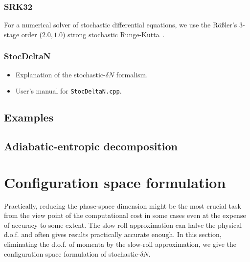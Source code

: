 \documentclass[aps, prd
, preprint
, nofootinbib 
, longbibliography
]{revtex4-1}
\begin{document}
\subsubsection{SRK32}

For a numerical solver of stochastic differential equations, we use the R\"o\ss ler's 3-stage order ($2.0,1.0$) strong stochastic Runge-Kutta~\cite{rossler2010runge}.





\subsubsection{StocDeltaN}

\begin{itemize}
\item Explanation of the stochastic-$\delta N$ formalism.
\item User's manual for \texttt{StocDeltaN.cpp}.
\end{itemize}



\subsection{Examples}


\subsection{Adiabatic-entropic decomposition}\label{sec: Adiabatic-entropic decomposition}



\section{Configuration space formulation}

Practically, reducing the phase-space dimension might be the most crucial task from the view point of the computational cost in some cases 
even at the expense of accuracy to some extent. The slow-roll approximation can halve the physical d.o.f. and often gives results practically accurate enough.
In this section, eliminating the d.o.f. of momenta by the slow-roll approximation, we give the configuration space formulation of stochastic-$\delta N$.
\end{document}

